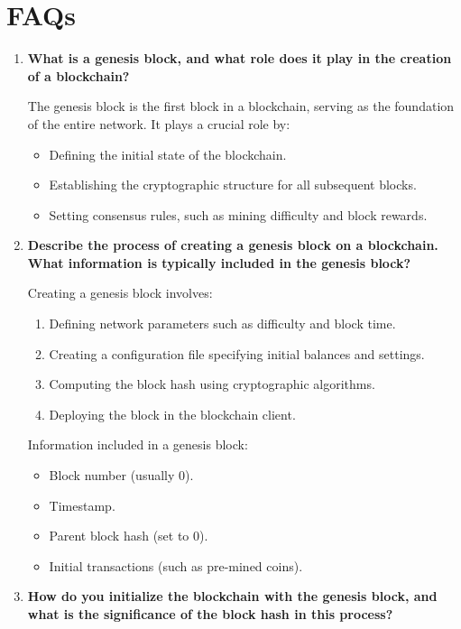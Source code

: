 \documentclass[11pt]{article}
\begin{document}
\section{FAQs}

\begin{enumerate}
    \item \textbf{What is a genesis block, and what role does it play in the creation of a blockchain?}
    
    The genesis block is the first block in a blockchain, serving as the foundation of the entire network. It plays a crucial role by:
    \begin{itemize}
        \item Defining the initial state of the blockchain.
        \item Establishing the cryptographic structure for all subsequent blocks.
        \item Setting consensus rules, such as mining difficulty and block rewards.
    \end{itemize}

    \item \textbf{Describe the process of creating a genesis block on a blockchain. What information is typically included in the genesis block?}
    
    Creating a genesis block involves:
    \begin{enumerate}
        \item Defining network parameters such as difficulty and block time.
        \item Creating a configuration file specifying initial balances and settings.
        \item Computing the block hash using cryptographic algorithms.
        \item Deploying the block in the blockchain client.
    \end{enumerate}
    
    Information included in a genesis block:
    \begin{itemize}
        \item Block number (usually 0).
        \item Timestamp.
        \item Parent block hash (set to 0).
        \item Initial transactions (such as pre-mined coins).
    \end{itemize}

    \item \textbf{How do you initialize the blockchain with the genesis block, and what is the significance of the block hash in this process?}
    

\end{enumerate}
\end{document}
